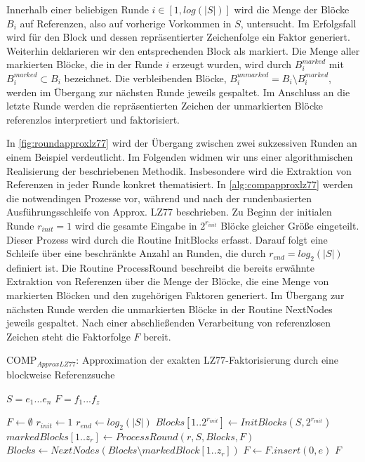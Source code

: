 Innerhalb einer beliebigen Runde $i\in [1,log(|S|)]$ wird die Menge der Blöcke $B_i$ auf Referenzen, also auf vorherige Vorkommen in $S$, untersucht. Im Erfolgsfall wird für den Block und
dessen repräsentierter Zeichenfolge ein Faktor generiert. Weiterhin deklarieren wir den entsprechenden Block als markiert. Die Menge aller markierten Blöcke, die in der Runde $i$
erzeugt wurden, wird durch $B_i^{marked}$ mit $B_i^{marked}\subset B_i$ bezeichnet. Die verbleibenden Blöcke, $B_i^{unmarked}=B_i\setminus B_i^{marked}$, werden im Übergang
zur nächsten Runde jeweils gespaltet. Im Anschluss an die letzte Runde werden die repräsentierten Zeichen der unmarkierten Blöcke referenzlos interpretiert und faktorisiert.

In \ref{fig:roundapproxlz77} wird der Übergang zwischen zwei sukzessiven Runden an einem Beispiel verdeutlicht. Im Folgenden widmen wir uns einer algorithmischen Realisierung der beschriebenen
Methodik. Insbesondere wird die Extraktion von Referenzen in jeder Runde konkret thematisiert.
In \ref{alg:compapproxlz77} werden die notwendingen Prozesse vor, während und nach der rundenbasierten Ausführungsschleife von Approx. LZ77 beschrieben. Zu Beginn der initialen
Runde $r_{init}=1$ wird die gesamte Eingabe in $2^{r_{init}}$ Blöcke gleicher Größe eingeteilt. Dieser Prozess wird durch die Routine InitBlocks erfasst. Darauf folgt eine Schleife
über eine beschränkte Anzahl an Runden, die durch $r_{end}=log_2(|S|)$ definiert ist. Die Routine ProcessRound beschreibt die bereits erwähnte Extraktion von Referenzen über die
Menge der Blöcke, die eine Menge von markierten Blöcken und den zugehörigen Faktoren generiert. Im Übergang zur nächsten Runde werden die unmarkierten Blöcke in der Routine 
NextNodes jeweils gespaltet. Nach einer abschließenden Verarbeitung von referenzlosen Zeichen steht die Faktorfolge $F$ bereit.

\begin{algorithm}[ht]
\centering
\caption{COMP$_{ApproxLZ77}$: Approximation der exakten LZ77-Faktorisierung durch eine blockweise Referenzsuche} \label{alg:compapproxlz77}
\algorithmicrequire $S=e_1...e_n$
\algorithmicensure $F=f_1...f_z$
\begin{algorithmic}[1]
    \STATE $F \gets \emptyset$
    \STATE $r_{init} \gets 1$
    \STATE $r_{end} \gets log_2(|S|)$
    \STATE $Blocks[1..2^{r_{init}}] \gets InitBlocks(S, 2^{r_{init}})$ 
        \STATE $markedBlocks[1..z_r] \gets ProcessRound(r, S, Blocks, F)$
        \STATE $Blocks \gets NextNodes(Blocks\setminus markedBlock[1..z_r])$ 
    \ENDFOR
        \STATE $F \gets F.insert(0, e)$ 
    \ENDFOR
    \RETURN $F$
\end{algorithmic}
\end{algorithm}

